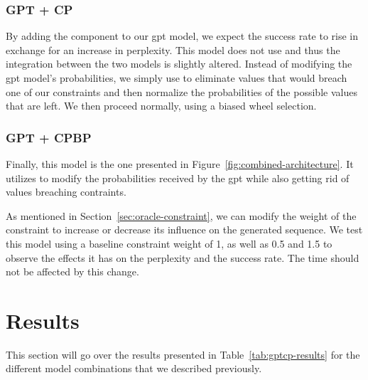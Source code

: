 \documentclass[../Document.tex]{subfiles}
\begin{document}
\subsubsection{GPT + CP}
By adding the \cp component to our \gls{gpt} model, we expect the success rate to rise in exchange for an increase in perplexity.
This model does not use \bp and thus the integration between the two models is slightly altered.
Instead of modifying the \gls{gpt} model's probabilities, we simply use \cp to eliminate values that would breach one of our constraints and then normalize the probabilities of the possible values that are left.
We then proceed normally, using a biased wheel selection.

\subsubsection{GPT + CPBP}
Finally, this model is the one presented in Figure~\ref{fig:combined-architecture}.
It utilizes \bp to modify the probabilities received by the \gls{gpt} while also getting rid of values breaching contraints.

As mentioned in Section~\ref{sec:oracle-constraint}, we can modify the weight of the \oracle constraint to increase or decrease its influence on the generated sequence.
We test this model using a baseline constraint weight of 1, as well as 0.5 and 1.5 to observe the effects it has on the perplexity and the success rate. The time should not be affected by this change.


\section{Results}
This section will go over the results presented in Table~\ref{tab:gptcp-results} for the different model combinations that we described previously.
\end{document}

